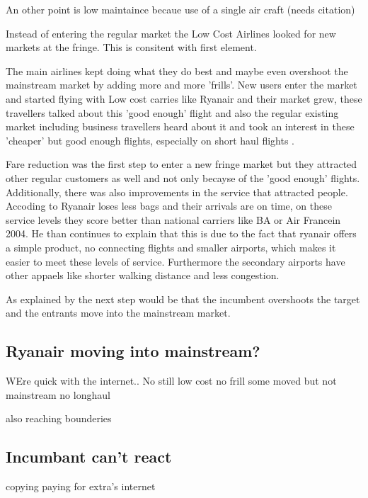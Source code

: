 \documentclass[a4paper, 11pt]{article}
\begin{document}
An other point is low maintaince becaue use of a single air craft (needs citation)

Instead of entering the regular market the Low Cost Airlines looked for new markets at the fringe. This is consitent with \cite{Christensen} first element.

The main airlines kept doing what they do best and maybe even overshoot the mainstream market by adding more and more 'frills'. New users enter the market and started flying with Low cost carries like Ryanair and their market grew, these travellers talked about this 'good enough' flight and also the regular existing market including business travellers heard about it and took an interest in these 'cheaper' but good enough flights, especially on short haul flights \citep{TiddBessant}.

Fare reduction was the first step to enter a new fringe market but they attracted other regular customers as well and not only becayse of the 'good enough' flights. Additionally, there was also improvements in the service that attracted people. Accoding to \cite{Barrett} Ryanair loses less bags and their arrivals are on time, on these service levels they score better than national carriers like BA or Air Francein 2004. He \citep{Barrett} than continues to explain that this is due to the fact that ryanair offers a simple product, no connecting flights and smaller airports, which makes it easier to meet these levels of service. Furthermore the secondary airports have other appaels like shorter walking distance and less congestion.

As explained by \cite{chistensen} the next step would be that the incumbent overshoots the target and the entrants move into the mainstream market.




\subsection{Ryanair moving into mainstream?}
\label{limits}

WEre quick with the internet..
No still low cost no frill some moved but not mainstream
no longhaul

also reaching bounderies


\subsection{Incumbant can't react}
\label{What did they do}

copying
paying for extra's
internet
\end{document}
